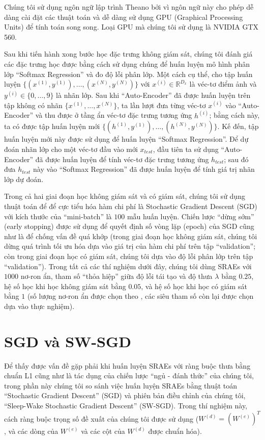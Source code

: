 Chúng tôi sử dụng ngôn ngữ lập trình Theano \cite{bergstra+al:2010-scipy} bởi vì ngôn ngữ này cho phép dễ dàng cài đặt các thuật toán và dễ dàng sử dụng GPU (Graphical Processing Units) để tính toán song song. Loại GPU mà chúng tôi sử dụng là NVIDIA GTX 560.

Sau khi tiến hành xong bước học đặc trưng không giám sát, chúng tôi đánh giá các đặc trưng học được bằng cách sử dụng chúng để huấn luyện mô hình phân lớp ``Softmax Regression'' và đo độ lỗi phân lớp. Một cách cụ thể, cho tập huấn luyện $\{(x^{(1)}, y^{(1)}), \ldots, (x^{(N)}, y^{(N)})\}$ với $x^{(i)} \in \mathbb{R}^{D_x}$ là véc-tơ điểm ảnh và $y^{(i)} \in \{0, \ldots, 9\}$ là nhãn lớp. Sau khi ``Auto-Encoder'' đã được huấn luyện trên tập không có nhãn $\{x^{(1)}, \ldots, x^{(N)}\}$, ta lần lượt đưa từng véc-tơ $x^{(i)}$ vào ``Auto-Encoder'' và thu được ở tầng ẩn véc-tơ đặc trưng tương ứng $h^{(i)}$; bằng cách này, ta có được tập huấn luyện mới $\{(h^{(1)}, y^{(1)}), \ldots, (h^{(N)}, y^{(N)})\}$. Kế đến, tập huấn luyện mới này được sử dụng để huấn luyện ``Softmax Regression''. Để dự đoán nhãn lớp cho một véc-tơ đầu vào mới $x_{test}$, đầu tiên ta sử dụng ``Auto-Encoder'' đã được huấn luyện để tính véc-tơ đặc trưng tương ứng $h_{test}$; sau đó đưa $h_{test}$ này vào ``Softmax Regression'' đã được huấn luyện để tính giá trị nhãn lớp dự đoán.

Trong cả hai giai đoạn học không giám sát và có giám sát, chúng tôi sử dụng thuật toán để để cực tiểu hóa hàm chi phí là Stochastic Gradient Descent (SGD) với kích thước của ``mini-batch'' là $100$ mẫu huấn luyện. Chiến lược ``dừng sớm'' (early stopping) được sử dụng để quyết định số vòng lặp (epoch) của SGD cũng như là để chống vấn đề quá khớp (trong giai đoạn học không giám sát, chúng tôi dừng quá trình tối ưu hóa dựa vào giá trị của hàm chi phí trên tập ``validation''; còn trong giai đoạn học có giám sát, chúng tôi dựa vào độ lỗi phân lớp trên tập ``validation''). Trong tất cả các thí nghiệm dưới đây, chúng tôi dùng SRAEs với $1000$ nơ-ron ẩn, tham số ``thỏa hiệp'' giữa độ lỗi tái tạo và độ thưa $\lambda$ bằng $0.25$, hệ số học khi học không giám sát bằng $0.05$, và hệ số học khi học có giám sát bằng $1$ (số lượng nơ-ron ẩn được chọn theo \cite{rifai2011HCAEs}, các siêu tham số còn lại được chọn dựa vào thực nghiệm).
\section{SGD và SW-SGD}
Để thấy được vấn đề gặp phải khi huấn luyện SRAEs với ràng buộc thưa bằng chuẩn L1 cũng như là tác dụng của chiến lược ``ngủ - đánh thức'' của chúng tôi, trong phần này chúng tôi so sánh việc huấn luyện SRAEs bằng thuật toán ``Stochastic Gradient Descent'' (SGD) và phiên bản điều chỉnh của chúng tôi, ``Sleep-Wake Stochastic Gradient Descent'' (SW-SGD). Trong thí nghiệm này, cách ràng buộc trọng số đề xuất của chúng tôi được sử dụng ($W^{(d)} = (W^{(e)})^T$, và các dòng của $W^{(e)}$ và các cột của $W^{(d)}$ được chuẩn hóa).

